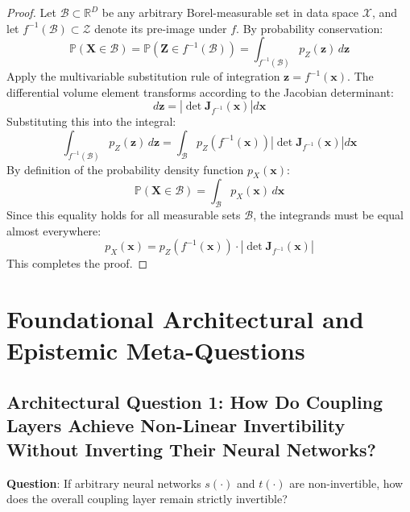 \documentclass[11pt,a4paper]{article}
\theoremstyle{definition}
\begin{document}
\begin{proof}
Let $\mathcal{B} \subset \mathbb{R}^D$ be any arbitrary Borel-measurable set in data space $\mathcal{X}$, and let $f^{-1}(\mathcal{B}) \subset \mathcal{Z}$ denote its pre-image under $f$.
By probability conservation:
{\boldmath
\begin{equation}
\mathbb{P}(\mathbf{X} \in \mathcal{B}) = \mathbb{P}(\mathbf{Z} \in f^{-1}(\mathcal{B})) = \int_{f^{-1}(\mathcal{B})} p_Z(\mathbf{z}) \, d\mathbf{z}
\end{equation}
}
Apply the multivariable substitution rule of integration $\mathbf{z} = f^{-1}(\mathbf{x})$. The differential volume element transforms according to the Jacobian determinant:
{\boldmath
\begin{equation}
d\mathbf{z} = \left| \det \mathbf{J}_{f^{-1}}(\mathbf{x}) \right| d\mathbf{x}
\end{equation}
}
Substituting this into the integral:
{\boldmath
\begin{equation}
\int_{f^{-1}(\mathcal{B})} p_Z(\mathbf{z}) \, d\mathbf{z} = \int_{\mathcal{B}} p_Z(f^{-1}(\mathbf{x})) \left| \det \mathbf{J}_{f^{-1}}(\mathbf{x}) \right| d\mathbf{x}
\end{equation}
}
By definition of the probability density function $p_X(\mathbf{x})$:
{\boldmath
\begin{equation}
\mathbb{P}(\mathbf{X} \in \mathcal{B}) = \int_{\mathcal{B}} p_X(\mathbf{x}) \, d\mathbf{x}
\end{equation}
}
Since this equality holds for all measurable sets $\mathcal{B}$, the integrands must be equal almost everywhere:
{\boldmath
\begin{equation}
p_X(\mathbf{x}) = p_Z(f^{-1}(\mathbf{x})) \cdot \left| \det \mathbf{J}_{f^{-1}}(\mathbf{x}) \right|
\end{equation}
}
This completes the proof.
\end{proof}

\section{Foundational Architectural and Epistemic Meta-Questions}

\subsection{Architectural Question 1: How Do Coupling Layers Achieve Non-Linear Invertibility Without Inverting Their Neural Networks?}
\textbf{Question}: If arbitrary neural networks $s(\cdot)$ and $t(\cdot)$ are non-invertible, how does the overall coupling layer remain strictly invertible?
\end{document}
